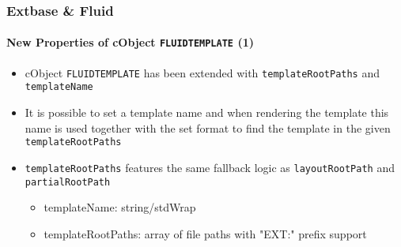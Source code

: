 \begin{frame}[fragile]
	\frametitle{Extbase \& Fluid}
	\framesubtitle{New Properties of cObject \texttt{FLUIDTEMPLATE} (1)}

	\begin{itemize}

		\item cObject \texttt{FLUIDTEMPLATE} has been extended with
			\texttt{templateRootPaths} and \texttt{templateName}

		\item It is possible to set a template name and when rendering the template this
			name is used together with the set format to find the template in the given
			\texttt{templateRootPaths}

		\item \texttt{templateRootPaths} features the same fallback logic as
			\texttt{layoutRootPath} and \texttt{partialRootPath}

			\begin{itemize}
				\item templateName: string/stdWrap
				\item templateRootPaths: array of file paths with "EXT:" prefix support
			\end{itemize}

	\end{itemize}

\end{frame}


